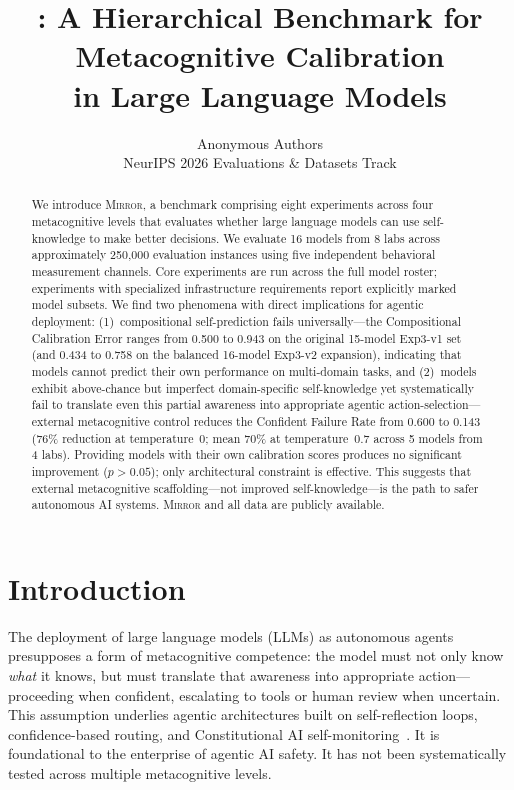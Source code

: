 \documentclass[10pt]{article}
\title{\mirror{}: A Hierarchical Benchmark for Metacognitive Calibration\\in Large Language Models}
\author{
  Anonymous Authors \\
  NeurIPS 2026 Evaluations \& Datasets Track
}
\date{}
\newcommand{\mirror}{\textsc{Mirror}}
\begin{document}
\maketitle

\begin{abstract}
We introduce \mirror{}, a benchmark comprising eight experiments across four
metacognitive levels that evaluates whether large language models can use
self-knowledge to make better decisions. We evaluate 16 models from 8 labs across
approximately 250,000 evaluation instances using five independent behavioral
measurement channels. Core experiments are run across the full model roster; experiments with specialized infrastructure requirements report explicitly marked model subsets. We find two phenomena with direct implications for agentic
deployment: (1)~compositional self-prediction fails universally---the Compositional
Calibration Error ranges from 0.500 to 0.943 on the original 15-model Exp3-v1 set
(and 0.434 to 0.758 on the balanced 16-model Exp3-v2 expansion), indicating that
models cannot predict their own performance on multi-domain tasks, and (2)~models
exhibit above-chance but imperfect domain-specific self-knowledge yet systematically
fail to translate even this partial awareness into appropriate agentic
action-selection---external metacognitive control reduces the Confident Failure Rate
from 0.600 to 0.143 (76\% reduction at temperature~0; mean 70\% at temperature~0.7 across 5 models from 4 labs).
Providing models with their own calibration scores produces no significant
improvement ($p > 0.05$); only architectural constraint is effective. This suggests
that external metacognitive scaffolding---not improved self-knowledge---is the path
to safer autonomous AI systems. \mirror{} and all data are publicly available.
\end{abstract}

\section{Introduction}
\label{sec:intro}

The deployment of large language models (LLMs) as autonomous agents presupposes a
form of metacognitive competence: the model must not only know \textit{what} it
knows, but must translate that awareness into appropriate action---proceeding when
confident, escalating to tools or human review when uncertain. This assumption
underlies agentic architectures built on self-reflection loops, confidence-based
routing, and Constitutional AI self-monitoring~\citep{perez2022sycophancy}. It is
foundational to the enterprise of agentic AI safety. It has not been
systematically tested across multiple metacognitive levels.
\end{document}
